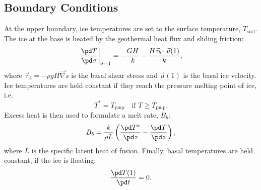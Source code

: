 \subsection{Boundary Conditions}
At the upper boundary, ice temperatures are set to the surface temperature, $T_{\text{surf}}$. The ice at the base is heated by the geothermal heat flux and sliding friction:
\begin{equation}
  \left.\frac{\pd T}{\pd\sigma}\right|_{\sigma=1}=-\frac{GH}k-\frac{H\vec{\tau}_b\cdot\vec{u}(1)}k,
\end{equation}
where $\vec{\tau}_b=-\rho gH\vec\nabla s$ is the basal shear stress and $\vec{u}(1)$ is the basal ice velocity. Ice temperatures are held constant if they reach the pressure melting point of ice, i.e.
\begin{equation}
  T^\ast=T_{\text{pmp}} \quad\text{if $T\ge T_{\text{pmp}}$}.
\end{equation}
Excess heat is then used to formulate a melt rate, $B_b$:
\begin{equation}
  \label{temp.eq.meltrate}
  B_b=\frac{k}{\rho L}\left(\frac{\pd T^\ast}{\pd z}-\frac{\pd T}{\pd z}\right),
\end{equation}
where $L$ is the specific latent heat of fusion. Finally, basal temperatures are held constant, if the ice is floating:
\begin{equation}
  \frac{\pd T(1)}{\pd t}  = 0.
\end{equation}


